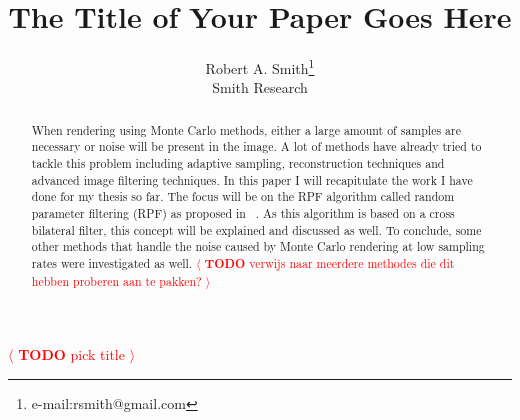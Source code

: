 \documentclass[review]{acmsiggraph}
\title{The Title of Your Paper Goes Here}
\author{Robert A. Smith\thanks{e-mail:rsmith@gmail.com}\\Smith Research}
\newcommand{\todo}[1]{\textcolor{red}{\(\langle\) \textbf{TODO} #1 \(\rangle\) }}
\begin{document}



\maketitle
\todo{pick title}


\begin{abstract}

When rendering using Monte Carlo methods, either a large amount of samples are necessary or noise will be present in the image.
A lot of methods have already tried to tackle this problem including adaptive sampling, reconstruction techniques and advanced image filtering techniques.
In this paper I will recapitulate the work I have done for my thesis so far. 
The focus will be on the RPF algorithm called random parameter filtering (RPF) as proposed in ~\cite{RPF11}.
As this algorithm is based on a cross bilateral filter, this concept will be explained and discussed as well.
To conclude, some other methods that handle the noise caused by Monte Carlo rendering at low sampling rates were investigated as well.
\todo{verwijs naar meerdere methodes die dit hebben proberen aan te pakken?}~\cite{dutré2006advanced}




\end{abstract}
\end{document}
